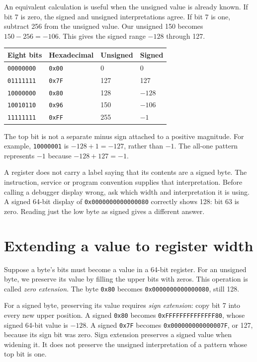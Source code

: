An equivalent calculation is useful when the unsigned value is already known.
If bit 7 is zero, the signed and unsigned interpretations agree. If bit 7 is one,
subtract 256 from the unsigned value. Our unsigned 150 becomes $150-256=-106$.
This gives the signed range $-128$ through 127.

\begin{center}
  \begin{tabular}{llll}
    \toprule
    Eight bits        & Hexadecimal   & Unsigned & Signed \\
    \midrule
    \texttt{00000000} & \texttt{0x00} & 0        & 0      \\
    \texttt{01111111} & \texttt{0x7F} & 127      & 127    \\
    \texttt{10000000} & \texttt{0x80} & 128      & $-128$ \\
    \texttt{10010110} & \texttt{0x96} & 150      & $-106$ \\
    \texttt{11111111} & \texttt{0xFF} & 255      & $-1$   \\
    \bottomrule
  \end{tabular}
\end{center}

The top bit is not a separate minus sign attached to a positive magnitude.
For example, \texttt{10000001} is $-128+1=-127$, rather than $-1$.
The all-one pattern represents $-1$ because $-128+127=-1$.

A register does not carry a label saying that its contents are a signed byte.
The instruction, service or program convention supplies that interpretation.
Before calling a debugger display wrong, ask which width and interpretation it
is using. A signed 64-bit display of \texttt{0x0000000000000080} correctly shows
128: bit 63 is zero. Reading just the low byte as signed gives a different answer.

\section{Extending a value to register width}

Suppose a byte's bits must become a value in a 64-bit register. For an unsigned
byte, we preserve its value by filling the upper bits with zeros. This operation
is called \emph{zero extension}. The byte \texttt{0x80} becomes
\texttt{0x0000000000000080}, still 128.

For a signed byte, preserving its value requires \emph{sign extension}: copy
bit 7 into every new upper position. A signed \texttt{0x80} becomes
\texttt{0xFFFFFFFFFFFFFF80}, whose signed 64-bit value is $-128$.
A signed \texttt{0x7F} becomes \texttt{0x000000000000007F}, or 127, because its
sign bit was zero. Sign extension preserves a signed value when widening it.
It does not preserve the unsigned interpretation of a pattern whose top bit is one.

